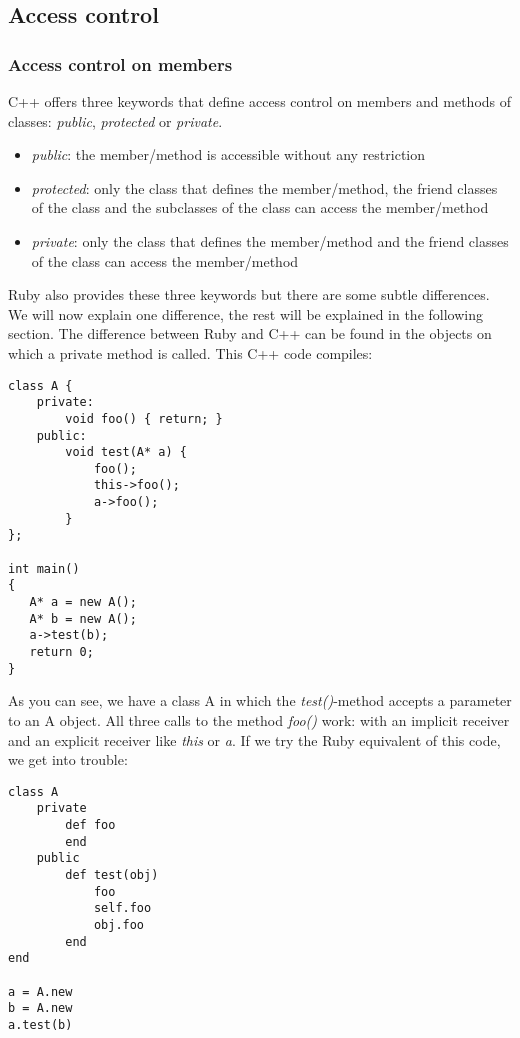 \documentclass[10pt,a4paper,twocolumn]{article}
\begin{document}
\subsection{Access control}

\subsubsection{Access control on members}
C++ offers three keywords that define access control on members and methods of classes: \textit{public}, \textit{protected} or \textit{private}. 

\begin{itemize}
\item \textit{public}: the member/method is accessible without any restriction
\item \textit{protected}: only the class that defines the member/method, the friend classes of the class and the subclasses of the class can access the member/method
\item \textit{private}: only the class that defines the member/method and the friend classes of the class can access the member/method
\end{itemize}

Ruby also provides these three keywords but there are some subtle differences. We will now explain one difference, the rest will be explained in the following section. The difference between Ruby and C++ can be found in the objects on which a private method is called. This C++ code compiles:

\begin{lstlisting}
class A {
	private:
		void foo() { return; }
	public:
		void test(A* a) {
			foo();
			this->foo();
			a->foo();
		}
};
 
int main()
{
   A* a = new A();
   A* b = new A();
   a->test(b);
   return 0;
}
\end{lstlisting}

As you can see, we have a class A in which the \textit{test()}-method accepts a parameter to an A object. All three calls to the method \textit{foo()} work: with an implicit receiver and an explicit receiver like \textit{this} or \textit{a}. If we try the Ruby equivalent of this code, we get into trouble:

\begin{lstlisting}
class A
	private
		def foo
		end
	public
		def test(obj)
			foo
			self.foo
			obj.foo
		end
end

a = A.new
b = A.new
a.test(b)
\end{lstlisting}
\end{document}
